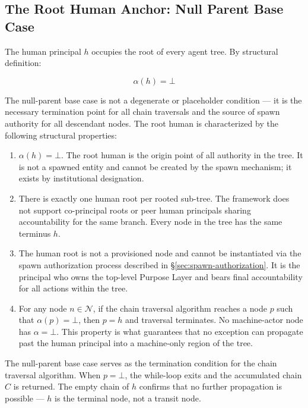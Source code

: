 \subsection{The Root Human Anchor: Null Parent Base Case}

The human principal $h$ occupies the root of every \bxthree{} agent tree. By structural definition:

\begin{equation}
\alpha(h) = \bot
\tag{HR-1}
\end{equation}

The null-parent base case is not a degenerate or placeholder condition — it is the necessary termination point for all chain traversals and the source of spawn authority for all descendant nodes. The root human is characterized by the following structural properties:

\begin{enumerate}
\item[\textbf{H1 — Null Parent:}] $\alpha(h) = \bot$. The root human is the origin point of all authority in the tree. It is not a spawned entity and cannot be created by the spawn mechanism; it exists by institutional designation.

\item[\textbf{H2 — Unique Accountability Terminus:}] There is exactly one human root per rooted sub-tree. The framework does not support co-principal roots or peer human principals sharing accountability for the same branch. Every node in the tree has the same terminus $h$.

\item[\textbf{H3 — Non-spawnability:}] The human root is not a provisioned node and cannot be instantiated via the spawn authorization process described in \S\ref{sec:spawn-authorization}. It is the principal who owns the top-level Purpose Layer and bears final accountability for all actions within the tree.

\item[\textbf{H4 — Chain Termination:}] For any node $n \in \mathcal{N}$, if the chain traversal algorithm reaches a node $p$ such that $\alpha(p) = \bot$, then $p = h$ and traversal terminates. No machine-actor node has $\alpha = \bot$. This property is what guarantees that no exception can propagate past the human principal into a machine-only region of the tree.
\end{enumerate}

The null-parent base case serves as the termination condition for the chain traversal algorithm. When $p = \bot$, the while-loop exits and the accumulated chain $C$ is returned. The empty chain of $h$ confirms that no further propagation is possible — $h$ is the terminal node, not a transit node.

